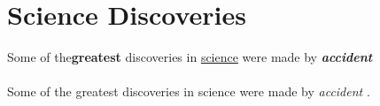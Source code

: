 \documentclass{article}
\begin{document}
	\section{Science Discoveries}
	Some of the\textbf{greatest}
	discoveries in \underline{science}
	were made by
	\textbf{\textit{accident}}
	
	\paragraph{}
	Some of the greatest discoveries in
	science were made by \emph{accident} .
	
\end{document}
